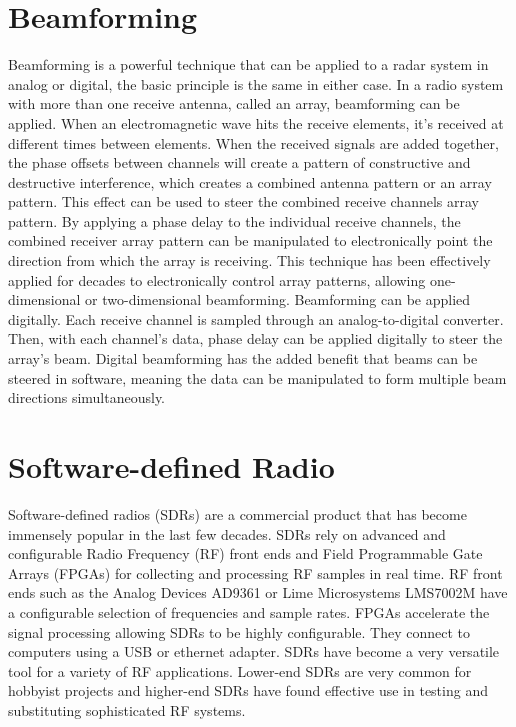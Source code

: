 \section{Beamforming}
\label{sec:beamforming}
Beamforming is a powerful technique that can be applied to a radar system in analog or digital, the basic principle is the same in either case.
In a radio system with more than one receive antenna, called an array, beamforming can be applied.
When an electromagnetic wave hits the receive elements, it's received at different times between elements.
When the received signals are added together, the phase offsets between channels will create a pattern of constructive and destructive interference, which creates a combined antenna pattern or an array pattern.
This effect can be used to steer the combined receive channels array pattern.
By applying a phase delay to the individual receive channels, the combined receiver array pattern can be manipulated to electronically point the direction from which the array is receiving.
This technique has been effectively applied for decades to electronically control array patterns, allowing one-dimensional or two-dimensional beamforming.
Beamforming can be applied digitally.
Each receive channel is sampled through an analog-to-digital converter.
Then, with each channel's data, phase delay can be applied digitally to steer the array's beam.
Digital beamforming has the added benefit that beams can be steered in software, meaning the data can be manipulated to form multiple beam directions simultaneously.


\section{Software-defined Radio}
\label{sec:software_defined_radio}
Software-defined radios (SDRs) are a commercial product that has become immensely popular in the last few decades.
SDRs rely on advanced and configurable Radio Frequency (RF) front ends and Field Programmable Gate Arrays (FPGAs) for collecting and processing RF samples in real time.
RF front ends such as the Analog Devices AD9361 or Lime Microsystems LMS7002M have a configurable selection of frequencies and sample rates.
FPGAs accelerate the signal processing allowing SDRs to be highly configurable.
They connect to computers using a USB or ethernet adapter. %
SDRs have become a very versatile tool for a variety of RF applications.
Lower-end SDRs are very common for hobbyist projects and higher-end SDRs have found effective use in testing and substituting sophisticated RF systems.

